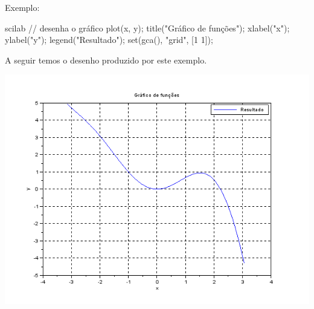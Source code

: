 \documentclass[11pt]{practice}
\begin{document}
\begin{enumerate}
  Exemplo:
  \begin{lst}{scilab}
// desenha o gráfico
plot(x, y);
title("Gráfico de funções");
xlabel("x");
ylabel("y");
legend("Resultado");
set(gca(), "grid", [1 1]);
  \end{lst}
  A seguir temos o desenho produzido por este exemplo.
  \begin{center}
    \includegraphics[width=\linewidth]{images/grafico}
  \end{center}
\end{enumerate}
\end{document}
